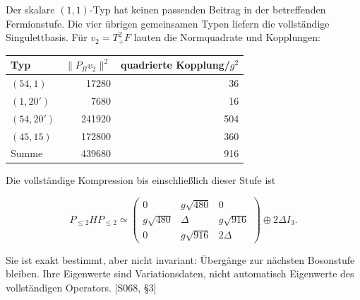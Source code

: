 Der skalare \((1,1)\)-Typ hat keinen passenden Beitrag in der
betreffenden Fermionstufe. Die vier übrigen gemeinsamen Typen liefern
die vollständige Singulettbasis. Für \(v_2=T_+^2F\) lauten die
Normquadrate und Kopplungen:

{\def\LTcaptype{none} %
\begin{longtable}[]{@{}lrr@{}}
\toprule\noalign{}
Typ & \(\|P_Rv_2\|^2\) & quadrierte Kopplung/\(g^2\) \\
\midrule\noalign{}
\endhead
\bottomrule\noalign{}
\endlastfoot
\((54,1)\) & 17280 & 36 \\
\((1,20')\) & 7680 & 16 \\
\((54,20')\) & 241920 & 504 \\
\((45,15)\) & 172800 & 360 \\
Summe & 439680 & 916 \\
\end{longtable}
}

Die vollständige Kompression bis einschließlich dieser Stufe ist

\[
P_{\le2}HP_{\le2}\simeq
\begin{pmatrix}
0&g\sqrt{480}&0\\
g\sqrt{480}&\Delta&g\sqrt{916}\\
0&g\sqrt{916}&2\Delta
\end{pmatrix}\oplus2\Delta I_3.
\]

Sie ist exakt bestimmt, aber nicht invariant: Übergänge zur nächsten
Bosonstufe bleiben. Ihre Eigenwerte sind Variationsdaten, nicht
automatisch Eigenwerte des vollständigen Operators. {[}S068, §3{]}

